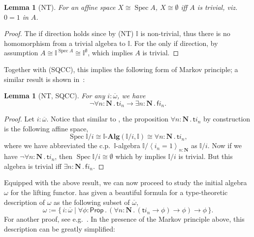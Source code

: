\documentclass[12pt]{amsart}
\newtheorem{lemma}[theorem]{Lemma}
\theoremstyle{definition}
\newcommand{\mb}[1]{\mathbf{#1}}
\newcommand{\mbb}[1]{\mathbb{#1}}
\newcommand{\I}{\mbb I}
\newcommand{\ms}[1]{\mathsf{#1}}
\newcommand{\alg}{\text{-}\mb{Alg}}
\newcommand{\ov}[1]{\overline{#1}}
\newcommand{\pair}[1]{\left\langle#1\right\rangle}
\newcommand{\scomp}[2]{\{\,#1\mid#2\,\}}
\newcommand{\N}{\mb N}
\newcommand{\fa}[2]{\forall #1\!\colon\!\!#2\mathpunct{.}}
\newcommand{\ex}[2]{\exists #1\!\colon\!\!#2\mathpunct{.}}
\newcommand{\emp}{\emptyset}
\newcommand{\pp}{\ms{Prop}}
\newcommand{\spec}{\operatorname{Spec}}
\begin{document}
\begin{lemma}[NT]\label{lem:nulls}
  For an affine space $X \cong \spec A$, $X \cong \emp$ iff $A$ is trivial, viz. $0=1$ in $A$.
\end{lemma}
\begin{proof}
  The if direction holds since by (NT) $\I$ is non-trivial, thus there is no homomorphism from a trivial algebra to $\I$. For the only if direction, by assumption $A \cong \I^{\spec A} \cong \I^\emp$, which implies $A$ is trivial. 
\end{proof}

Together with (SQCC), this implies the following form of Markov principle; a similar result is shown in~\cite{cherubini2024foundation}:

\begin{lemma}[NT, SQCC]\label{lem:markov}
  For any $i : \ov\omega$, we have
  \[ \neg\fa{n}{\N}\ms ti_n \to \ex n\N\ms fi_n. \]
\end{lemma}
\begin{proof}
  Let $i : \ov\omega$. Notice that similar to , the proposition $\fa n\N \ms ti_n$ by construction is the following affine space, 
  \[ \spec\I/i \cong \I\alg(\I/i,\I) \cong \fa n\N \ms ti_n, \]
  where we have abbreviated the c.p.\ $\I$-algebra $\I/\pair{i_n=1}_{n:\N}$ as $\I/i$. Now if we have $\neg\fa n\N \ms ti_n$, then $\spec\I/i \cong \emp$ which by  implies $\I/i$ is trivial. But this algebra is trivial iff $\ex n\N \ms fi_n$.
\end{proof}

Equipped with the above result, we can now proceed to study the initial algebra $\omega$ for the lifting functor. \cite{JIBLADZE1997185} has given a beautiful formula for a type-theoretic description of $\omega$ as the following subset of $\ov\omega$, 
\[ \omega := \scomp{i : \ov\omega}{\fa\phi{\pp} (\fa n{\N} (\ms ti_n \to \phi) \to \phi) \to \phi}. \]
For another proof, see e.g.~\cite{VANOOSTEN2000233}. In the presence of the Markov principle above, this description can be greatly simplified:
\end{document}
